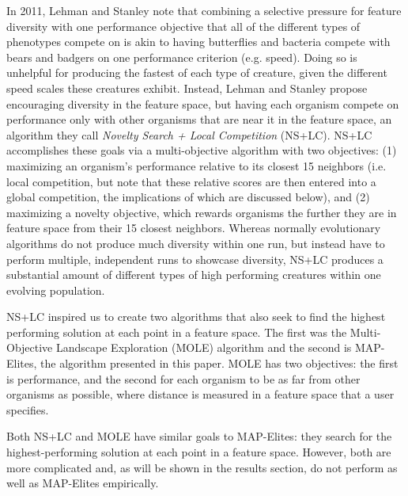 \documentclass[twocolumn, DIV25, 9pt]{scrartcl}
\begin{document}
In 2011, Lehman and Stanley\cite{lehman2011evolving} note that combining a selective pressure for feature diversity with one performance objective that all of the different types of phenotypes compete on is akin to having butterflies and bacteria compete with bears and badgers on one performance criterion (e.g. speed). Doing so is unhelpful for producing the fastest of each type of creature, given the different speed scales these creatures exhibit. Instead, Lehman and Stanley propose encouraging diversity in the feature space, but having each organism compete on performance only with other organisms that are near it in the feature space, an algorithm they call \emph{Novelty Search + Local Competition} (NS+LC)\cite{lehman2011evolving}. 
NS+LC accomplishes these goals via a multi-objective algorithm with two objectives: (1) maximizing an organism's performance relative to its closest 15 neighbors (i.e. local competition, but note that these relative scores are then entered into a global competition, the implications of which are discussed below), and (2) maximizing a novelty objective, which rewards organisms the further they are in feature space from their 15 closest neighbors. 
Whereas normally evolutionary algorithms do not produce much diversity within one run, but instead have to perform multiple, independent runs to showcase diversity\cite{cheney2013unshackling}, NS+LC produces a substantial amount of different types of high performing creatures within one evolving population\cite{lehman2011evolving}. 

NS+LC inspired us to create two algorithms that also seek to find the highest performing solution at each point in a feature space. The first was the Multi-Objective Landscape Exploration (MOLE) algorithm\cite{clune2013originModularity} and the second is MAP-Elites, the algorithm presented in this paper. MOLE has two objectives: the first is performance, and the second for each organism to be as far from other organisms as possible, where distance is measured in a feature space that a user specifies. 

Both NS+LC and MOLE have similar goals to MAP-Elites: they search for the highest-performing solution at each point in a feature space. However, both are more complicated and, as will be shown in the results section, do not perform as well as MAP-Elites empirically.
\end{document}
